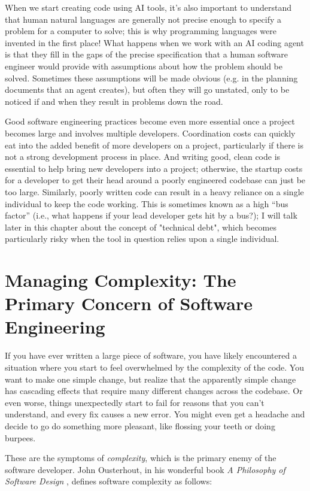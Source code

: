 When we start creating code using AI tools, it's also important to understand that human natural languages are generally not precise enough to specify a problem for a computer to solve; this is why programming languages were invented in the first place!  What happens when we work with an AI coding agent is that they fill in the gaps of the precise specification that a human software engineer would provide with assumptions about how the problem should be solved.  Sometimes these assumptions will be made obvious (e.g. in the planning documents that an agent creates), but often they will go unstated, only to be noticed if and when they result in problems down the road.  

Good software engineering practices become even more essential once a project becomes large and involves multiple developers.
Coordination costs can quickly eat into the added benefit of more developers on a project, particularly if there is not a strong development process in place.
And writing good, clean code is essential to help bring new developers into a project; otherwise, the startup costs for a developer to get their head around a poorly engineered codebase can just be too large.
Similarly, poorly written code can result in a heavy reliance on a single individual to keep the code working.  This is sometimes known as a high ``bus factor'' (i.e., what happens if your lead developer gets hit by a bus?); I will talk later in this chapter about the concept of "technical debt", which becomes particularly risky when the tool in question relies upon a single individual.

\section{Managing Complexity: The Primary Concern of Software Engineering}

If you have ever written a large piece of software, you have likely encountered a situation where you start to feel overwhelmed by the complexity of the code. You want to make one simple change, but realize that the apparently simple change has cascading effects that require many different changes across the codebase.  Or even worse, things unexpectedly start to fail for reasons that you can't understand, and every fix causes a new error.  You might even get a headache and decide to go do something more pleasant, like flossing your teeth or doing burpees.  

These are the symptoms of \textit{complexity}, which is the primary enemy of the software developer.  John Ousterhout, in his wonderful book \textit{A Philosophy of Software Design} \citep{Ousterhout:2021aa}, defines software complexity as follows:

